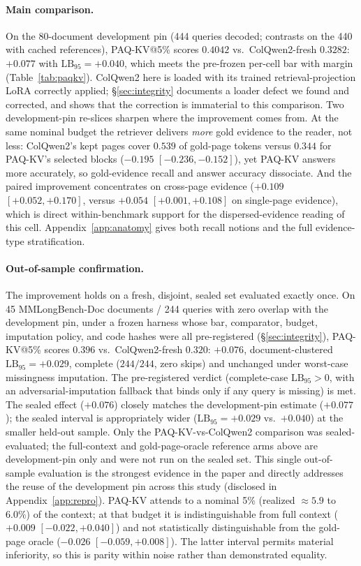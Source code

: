 \documentclass[letterpaper]{article} %
\newcommand{\paqc}{\textsc{PAQ-KV}}
\newcommand{\lb}{\mathrm{LB}_{95}}
\begin{document}
\paragraph{Main comparison.} On the 80-document development pin (444 queries decoded; contrasts on the 440 with cached references), \paqc{}@5\% scores $0.4042$ vs.\ ColQwen2-fresh $0.3282$: $+0.077$ with $\lb=+0.040$, which meets the pre-frozen per-cell bar with margin (Table~\ref{tab:paqkv}). ColQwen2 here is loaded with its trained retrieval-projection LoRA correctly applied; \S\ref{sec:integrity} documents a loader defect we found and corrected, and shows that the correction is immaterial to this comparison. Two development-pin re-slices sharpen where the improvement comes from. At the same nominal budget the retriever delivers \emph{more} gold evidence to the reader, not less: ColQwen2's kept pages cover $0.539$ of gold-page tokens versus $0.344$ for \paqc{}'s selected blocks ($-0.195$ $[-0.236,-0.152]$), yet \paqc{} answers more accurately, so gold-evidence recall and answer accuracy dissociate. And the paired improvement concentrates on cross-page evidence ($+0.109$ $[+0.052,+0.170]$, versus $+0.054$ $[+0.001,+0.108]$ on single-page evidence), which is direct within-benchmark support for the dispersed-evidence reading of this cell. Appendix~\ref{app:anatomy} gives both recall notions and the full evidence-type stratification.

\paragraph{Out-of-sample confirmation.} The improvement holds on a fresh, disjoint, sealed set evaluated exactly once. On 45 MMLongBench-Doc documents / 244 queries with zero overlap with the development pin, under a frozen harness whose bar, comparator, budget, imputation policy, and code hashes were all pre-registered (\S\ref{sec:integrity}), \paqc{}@5\% scores $0.396$ vs.\ ColQwen2-fresh $0.320$: $+0.076$, document-clustered $\lb=+0.029$, complete ($244/244$, zero skips) and unchanged under worst-case missingness imputation. The pre-registered verdict (complete-case $\lb>0$, with an adversarial-imputation fallback that binds only if any query is missing) is met. The sealed effect ($+0.076$) closely matches the development-pin estimate ($+0.077$); the sealed interval is appropriately wider ($\lb=+0.029$ vs.\ $+0.040$) at the smaller held-out sample. Only the \paqc{}-vs-ColQwen2 comparison was sealed-evaluated; the full-context and gold-page-oracle reference arms above are development-pin only and were not run on the sealed set. This single out-of-sample evaluation is the strongest evidence in the paper and directly addresses the reuse of the development pin across this study (disclosed in Appendix~\ref{app:repro}). \paqc{} attends to a nominal 5\% (realized ${\approx}5.9$ to $6.0\%$) of the context; at that budget it is indistinguishable from full context ($+0.009$ $[-0.022,+0.040]$) and not statistically distinguishable from the gold-page oracle ($-0.026$ $[-0.059,+0.008]$). The latter interval permits material inferiority, so this is parity within noise rather than demonstrated equality.
\end{document}
